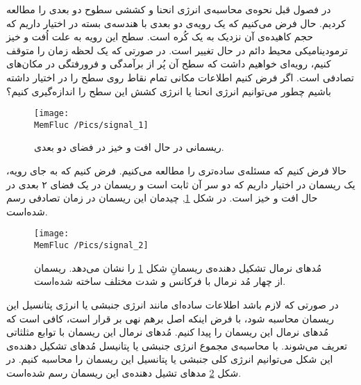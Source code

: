 


در فصول قبل نحوه‌ی محاسبه‌ی انرژی انحنا و کششی سطوح دو بعدی را مطالعه کردیم. حال فرض می‌کنیم که یک رویه‌ی دو بعدی با هندسه‌ی بسته در اختیار داریم که حجم کاهیده‌ی آن نزدیک به یک کُره است. سطح این رویه به علت اُفت و خیز ترمودینامیکی محیط دائم در حال تغییر است. در صورتی که یک لحظه زمان را متوقف کنیم، رویه‌ای خواهیم داشت که سطح آن پُر از برآمدگی و فرورفتگی در مکان‌های تصادفی است. اگر فرض کنیم اطلاعات مکانی تمام نقاط روی سطح را در اختیار داشته باشیم چطور می‌توانیم انرژی انحنا یا انرژی کشش این سطح را اندازه‌گیری کنیم؟ 

\begin{figure}[h]
\begin{center}
\texttt{[image: \\MemFluc /Pics/signal\_1]}
\caption{
 ریسمانی در حال افت و خیز در فضای دو بعدی. 
}
\label{fig:flucString1}
\end{center}
\end{figure}


حالا فرض کنیم که مسئله‌ی ساده‌تری را مطالعه می‌کنیم. فرض کنیم که به جای رویه، یک ریسمان در اختیار داریم که دو سر آن ثابت است و ریسمان  در یک فضای ۲ بعدی  در حال افت و خیز است. در شکل 
\ref{fig:flucString1},
چیدمان این ریسمان در زمان تصادفی‌ رسم شده‌است.
\begin{figure}[t]
\begin{center}
\texttt{[image: \\MemFluc /Pics/signal\_2]}
\caption{
مُدهای نرمال تشکیل دهنده‌ی ریسمانِ شکل
\ref{fig:flucString1}
را نشان می‌دهد. ریسمان از چهار مُد نرمال با فرکانس و شد‌ت مختلف ساخته شده‌است. 
}
\label{fig:flucString2}
\end{center}
\end{figure}
در صورتی که لازم باشد اطلاعات ساده‌ای مانند انرژی جنبشی یا انرژی پتانسیل این ریسمان محاسبه شود، با فرض اینکه اصل برهم نهی بر قرار است، کافی است که مُدهای نرمال این ریسمان را پیدا کنیم. مُدهای نرمال این ریسمان با توابع مثلثاتی تعریف می‌شوند. با محاسبه‌ی مجموع انرژی جنبشی یا پتانیسل مُدهای تشکیل دهنده‌ی این شکل می‌توانیم انرژی کلی جنبشی یا پتانسیل این ریسمان را محاسبه کنیم. در شکل
\ref{fig:flucString2}
مد‌های تشیل دهنده‌ی این ریسمان رسم شده‌است.



 
 
 
 
 
 
 
 
 
 
 